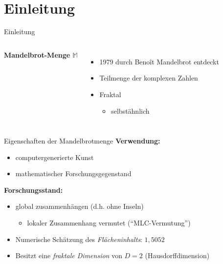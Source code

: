 \section{Einleitung}

\begin{frame}{Einleitung}
    \begin{columns}[c] %

        \textbf{Mandelbrot-Menge $\mathbb{M}$}
        \begin{itemize}
            \item 1979 durch Benoît Mandelbrot entdeckt
            \item Teilmenge der komplexen Zahlen
            \item Fraktal                           %
            \begin{itemize}
                \item selbstähnlich                 %
            \end{itemize}
        \end{itemize}

    \end{columns}
\end{frame}


\begin{frame}{Eigenschaften der Mandelbrotmenge}
    \textbf{Verwendung:}
    \begin{itemize}
        \item computergenerierte Kunst
        \item mathematischer Forschungsgegenstand %
    \end{itemize} \vspace{0.3cm}
    \pause
    \textbf{Forschungsstand:} 
    \begin{itemize}
        \item global zusammenhängen (d.h. ohne Inseln)
        \begin{itemize}
            \item lokaler Zusammenhang vermutet ("`MLC-Vermutung"')  \cite{Mandelbrot2004}
        \end{itemize}
        \item Numerische Schätzung des \textit{Flächeninhalts}: $1,5052$ \cite{Andreadis2015}
        \item Besitzt eine \textit{fraktale Dimension} von $D=2$ (Hausdorffdimension) \cite{Shishikura1998}
    \end{itemize}
\end{frame}